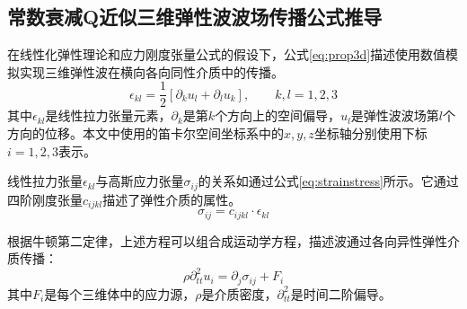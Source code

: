 \documentclass[degree=doctor]{thuthesis}
\begin{document}
\subsection{常数衰减Q近似三维弹性波波场传播公式推导}

在线性化弹性理论和应力刚度张量公式的假设下\cite{landau1986theory}，公式\ref{eq:prop3d}描述使用数值模拟实现三维弹性波在横向各向同性介质中的传播。
\begin{equation}
  \epsilon_{kl} = \frac{1}{2}\left[ \partial_k u_l + \partial_l u_k\right], \quad\quad k,l = 1,2,3
  \label{eq:prop3d}
\end{equation}
其中$\epsilon_{kl}$是线性拉力张量元素，$\partial_k$是第$k$个方向上的空间偏导，$u_l$是弹性波波场第$l$个方向的位移。本文中使用的笛卡尔空间坐标系中的$x, y, z$坐标轴分别使用下标$i=1, 2, 3$表示。

线性拉力张量$\epsilon_{kl}$与高斯应力张量$\sigma_{ij}$的关系如通过公式\ref{eq:strainstress}所示。它通过四阶刚度张量$c_{ijkl}$描述了弹性介质的属性。
\begin{equation}
  \sigma_{ij} = c_{ijkl}\cdot \epsilon_{kl}
  \label{eq:strainstress}
\end{equation}

根据牛顿第二定律，上述方程可以组合成运动学方程，描述波通过各向异性弹性介质传播：
\begin{equation}
  \rho \partial_{tt}^2u_i=\partial_j \sigma_{ij}+F_i
  \label{eq:partialtt}
\end{equation}
其中$F_i$是每个三维体中的应力源，$\rho$是介质密度，$\partial_{tt}^2$是时间二阶偏导。
\end{document}
